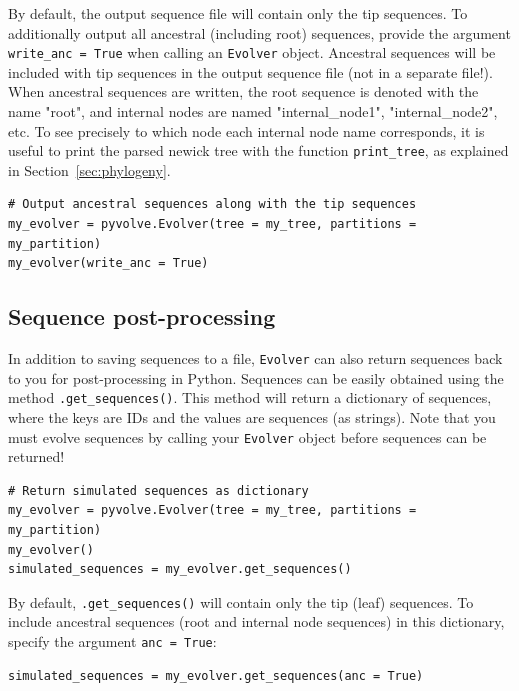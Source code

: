 \documentclass{article}
\newcommand{\code}[1]{\texttt{\small{#1}}}
\begin{document}
By default, the output sequence file will contain only the tip sequences. To additionally output all ancestral (including root) sequences, provide the argument \code{write\_anc = True} when calling an \code{Evolver} object. Ancestral sequences will be included with tip sequences in the output sequence file (not in a separate file!). When ancestral sequences are written, the root sequence is denoted with the name "root", and internal nodes are named "internal\_node1", "internal\_node2", etc. To see precisely to which node each internal node name corresponds, it is useful to print the parsed newick tree with the function \code{print\_tree}, as explained in Section~\ref{sec:phylogeny}.
\begin{lstlisting}
# Output ancestral sequences along with the tip sequences
my_evolver = pyvolve.Evolver(tree = my_tree, partitions = my_partition)
my_evolver(write_anc = True)
\end{lstlisting}

\subsection{Sequence post-processing}

In addition to saving sequences to a file, \code{Evolver} can also return sequences back to you for post-processing in Python. Sequences can be easily obtained using the method \code{.get\_sequences()}. This method will return a dictionary of sequences, where the keys are IDs and the values are sequences (as strings). Note that you must evolve sequences by calling your \code{Evolver} object before sequences can be returned!
\begin{lstlisting}
# Return simulated sequences as dictionary
my_evolver = pyvolve.Evolver(tree = my_tree, partitions = my_partition)
my_evolver()
simulated_sequences = my_evolver.get_sequences()
\end{lstlisting}

By default, \code{.get\_sequences()} will contain only the tip (leaf) sequences. To include ancestral sequences (root and internal node sequences) in this dictionary, specify the argument \code{anc = True}:
\begin{lstlisting}
simulated_sequences = my_evolver.get_sequences(anc = True)
\end{lstlisting}
\end{document}
